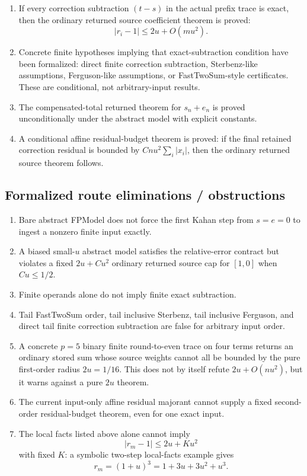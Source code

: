 \documentclass{article}
\begin{document}
\begin{enumerate}
\item If every correction subtraction \((t-s)\) in the actual prefix trace is
      exact, then the ordinary returned source coefficient theorem is proved:
      \[
        |r_i-1|\le 2u+O(mu^2).
      \]
\item Concrete finite hypotheses implying that exact-subtraction condition
      have been formalized: direct finite correction subtraction, Sterbenz-like
      assumptions, Ferguson-like assumptions, or FastTwoSum-style certificates.
      These are conditional, not arbitrary-input results.
\item The compensated-total returned theorem for \(s_n+e_n\) is proved
      unconditionally under the abstract model with explicit constants.
\item A conditional affine residual-budget theorem is proved: if the final
      retained correction residual is bounded by \(C n u^2\sum_i |x_i|\), then
      the ordinary returned source theorem follows.
\end{enumerate}

\subsection*{Formalized route eliminations / obstructions}

\begin{enumerate}
\item Bare abstract FPModel does not force the first Kahan step from
      \(s=e=0\) to ingest a nonzero finite input exactly.
\item A biased small-\(u\) abstract model satisfies the relative-error contract
      but violates a fixed \(2u+Cu^2\) ordinary returned source cap for
      \([1,0]\) when \(Cu\le 1/2\).
\item Finite operands alone do not imply finite exact subtraction.
\item Tail FastTwoSum order, tail inclusive Sterbenz, tail inclusive Ferguson,
      and direct tail finite correction subtraction are false for arbitrary
      input order.
\item A concrete \(p=5\) binary finite round-to-even trace on four terms
      returns an ordinary stored sum whose source weights cannot all be bounded
      by the pure first-order radius \(2u=1/16\).  This does not by itself
      refute \(2u+O(nu^2)\), but it warns against a pure \(2u\) theorem.
\item The current input-only affine residual majorant cannot supply a fixed
      second-order residual-budget theorem, even for one exact input.
\item The local facts listed above alone cannot imply
      \[
        |r_m-1|\le 2u+K u^2
      \]
      with fixed \(K\): a symbolic two-step local-facts example gives
      \[
        r_m=(1+u)^3=1+3u+3u^2+u^3.
      \]
\end{enumerate}
\end{document}
